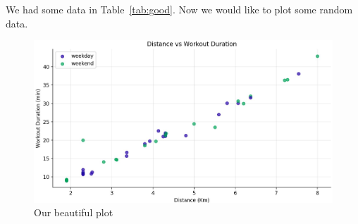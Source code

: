 
We had some data in Table~\ref{tab:good}. Now we would like to plot some random data.

\begin{figure}[h]
\centering
\includegraphics[width=\columnwidth]{plot.png}
\caption{Our beautiful plot}
\label{fig:plot}
\end{figure}